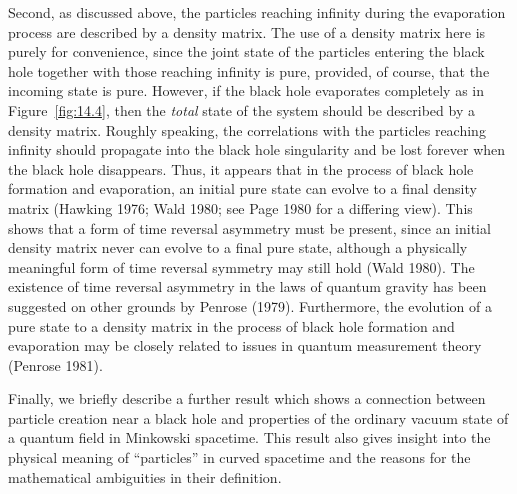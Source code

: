 Second, as discussed above, the particles reaching infinity during the evaporation
process are described by a density matrix. The use of a density matrix here is purely
for convenience, since the joint state of the particles entering the black hole together
with those reaching infinity is pure, provided, of course, that the incoming state is
pure. However, if the black hole evaporates completely as in Figure~\ref{fig:14.4},
then the \emph{total} state of the system should be described by a density matrix.
Roughly speaking, the correlations with the particles reaching infinity should
propagate into the black hole singularity and be lost forever when the black hole
disappears. Thus, it appears that in the process of black hole formation and
evaporation, an initial pure state can evolve to a final density matrix (Hawking 1976;
Wald 1980; see Page 1980 for a differing view). This shows that a form of time
reversal asymmetry must be present, since an initial density matrix never can evolve
to a final pure state, although a physically meaningful form of time reversal symmetry
may still hold (Wald 1980). The existence of time reversal asymmetry in the laws of
quantum gravity has been suggested on other grounds by Penrose (1979).
Furthermore, the evolution of a pure state to a density matrix in the process of black
hole formation and evaporation may be closely related to issues in quantum
measurement theory (Penrose 1981).

Finally, we briefly describe a further result which shows a connection between
particle creation near a black hole and properties of the ordinary vacuum state of a
quantum field in Minkowski spacetime. This result also gives insight into the physical
meaning of ``particles'' in curved spacetime and the reasons for the mathematical
ambiguities in their definition.

